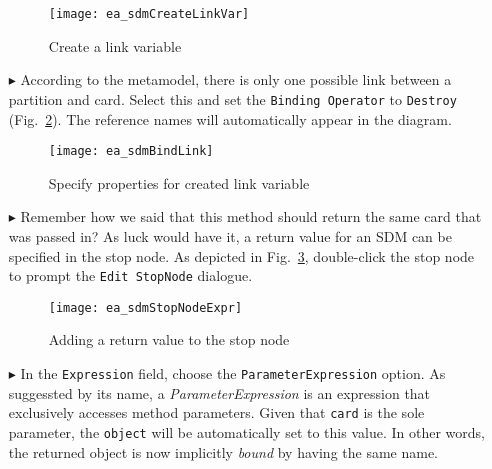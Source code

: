 \begin{itemize}
\begin{figure}[htpb]
\begin{center}
  \texttt{[image: ea\_sdmCreateLinkVar]}
  \caption{Create a link variable}   
  \label{fig:link_variable}
\end{center}
\end{figure}

\item[$\blacktriangleright$] According to the metamodel, there is only one possible link between a partition and card. Select this and set the
\texttt{Binding Operator} to \texttt{Destroy} (Fig.~\ref{fig:link_variable_properties}). The reference names will automatically appear in the diagram.

\vspace{0.5cm}

\begin{figure}[h!]
\begin{center} 
 \texttt{[image: ea\_sdmBindLink]}
  \caption{Specify properties for created link variable}  
  \label{fig:link_variable_properties}
\end{center}
\end{figure}

\vspace{0.5cm}

\item[$\blacktriangleright$] Remember how we said that this method should return the same card that was passed in? As luck would have it, a return value for an
SDM can be specified in the stop node. As depicted in Fig.~\ref{fig:stop_node_return_value}, double-click the stop node to prompt the \texttt{Edit StopNode} dialogue. 

\newpage

\begin{figure}[htbp]
\begin{center}
  \texttt{[image: ea\_sdmStopNodeExpr]}
  \caption{Adding a return value to the stop node}  
  \label{fig:stop_node_return_value}
\end{center}
\end{figure}

\item[$\blacktriangleright$] In the \texttt{Expression} field, choose the \texttt{ParameterExpression} option.
As suggessted by its name, a \emph{ParameterExpression} is an expression that exclusively accesses method parameters. Given that \texttt{card} is the sole
parameter, the \texttt{object} will be automatically set to this value. In other words, the returned object is now implicitly \emph{bound} by having the same
name.


\end{itemize}
